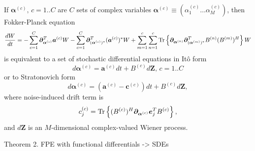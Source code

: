 \begin{theorem}
\label{thm:wigner-bec:fpe:mc-fpe-sde}
If $\bm{\alpha}^{(c)},\, c = 1..C$ are $C$ sets of complex variables $\bm{\alpha}^{(c)} \equiv (\alpha_1^{(c)} \ldots \alpha_M^{(c)})$,
then Fokker-Planck equation
\[
	\frac{dW}{dt}
	= - \sum_{c=1}^C \bm{\partial}_{\bm{\alpha}^{(c)}}^T \bm{a}^{(c)} W
	- \sum_{c=1}^C \bm{\partial}_{(\bm{\alpha}^{(c)})^*}^T (\bm{a}^{(c)})^* W
	+ \sum_{m=1}^c \sum_{n=1}^c
		\mathrm{Tr} \left\{ 
			\bm{\partial}_{\bm{\alpha}^{(n)}}
			\bm{\partial}_{(\bm{\alpha}^{(m)})^*}^T
			B^{(n)} (B^{(m)})^H
		 \right\} W
\]
is equivalent to a set of stochastic differential equations in It\^{o} form
\[
	d\bm{\alpha}^{(c)} = \bm{a}^{(c)} dt + B^{(c)} d\bm{Z},\, c = 1..C
\]
or to Stratonovich form
\[
	d\bm{\alpha}^{(c)} = (\bm{a}^{(c)} - \bm{c}^{(c)}) dt + B^{(c)} d\bm{Z},
\]
where noise-induced drift term is
\[
	c_j^{(c)} = \mathrm{Tr} \left\{  (B^{(c)})^H \bm{\partial}_{\bm{\alpha}^{(c)}} \bm{e}_j^T B^{(c)}  \right\},
\]
and $d\bm{Z}$ is an $M$-dimensional complex-valued Wiener process.
\end{theorem}

Theorem 2. FPE with functional differentials -> SDEs
